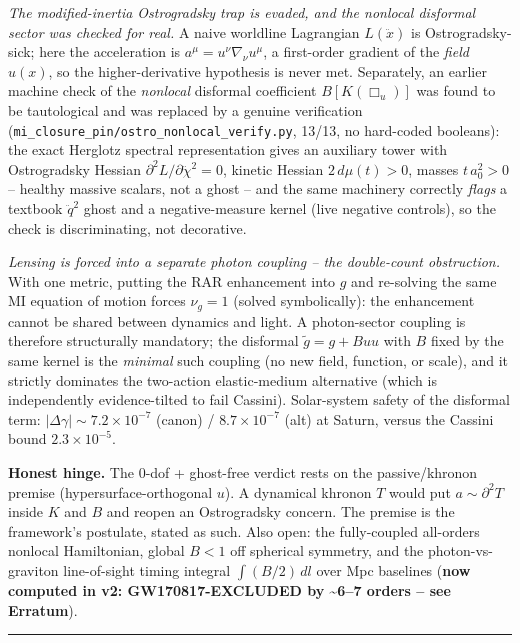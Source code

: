 \documentclass[
]{article}
\begin{document}
\emph{The modified-inertia Ostrogradsky trap is evaded, and the nonlocal
disformal sector was checked for real.} A naive worldline Lagrangian
\(L(\ddot x)\) is Ostrogradsky-sick; here the acceleration is
\(a^\mu = u^\nu \nabla_\nu u^\mu\), a first-order gradient of the
\emph{field} \(u(x)\), so the higher-derivative hypothesis is never met.
Separately, an earlier machine check of the \emph{nonlocal} disformal
coefficient \(B[K(\Box_u)]\) was found to be tautological and was
replaced by a genuine verification
(\texttt{mi\_closure\_pin/ostro\_nonlocal\_verify.py}, 13/13, no
hard-coded booleans): the exact Herglotz spectral representation gives
an auxiliary tower with Ostrogradsky Hessian
\(\partial^2 L/\partial\ddot\chi^2 = 0\), kinetic Hessian
\(2\, d\mu(t) > 0\), masses \(t\, a_0^2 > 0\) -- healthy massive
scalars, not a ghost -- and the same machinery correctly \emph{flags} a
textbook \(\ddot q^2\) ghost and a negative-measure kernel (live
negative controls), so the check is discriminating, not decorative.

\emph{Lensing is forced into a separate photon coupling -- the
double-count obstruction.} With one metric, putting the RAR enhancement
into \(g\) and re-solving the same MI equation of motion forces
\(\nu_g = 1\) (solved symbolically): the enhancement cannot be shared
between dynamics and light. A photon-sector coupling is therefore
structurally mandatory; the disformal \(\tilde g = g + B u u\) with
\(B\) fixed by the same kernel is the \emph{minimal} such coupling (no
new field, function, or scale), and it strictly dominates the two-action
elastic-medium alternative (which is independently evidence-tilted to
fail Cassini). Solar-system safety of the disformal term:
\(|\Delta\gamma| \sim 7.2 \times 10^{-7}\) (canon) /
\(8.7 \times 10^{-7}\) (alt) at Saturn, versus the Cassini bound
\(2.3 \times 10^{-5}\).

\textbf{Honest hinge.} The 0-dof + ghost-free verdict rests on the
passive/khronon premise (hypersurface-orthogonal \(u\)). A dynamical
khronon \(T\) would put \(a \sim \partial^2 T\) inside \(K\) and \(B\)
and reopen an Ostrogradsky concern. The premise is the framework's
postulate, stated as such. Also open: the fully-coupled all-orders
nonlocal Hamiltonian, global \(B < 1\) off spherical symmetry, and the
photon-vs-graviton line-of-sight timing integral \(\int (B/2)\, dl\)
over Mpc baselines (\textbf{now computed in v2: GW170817-EXCLUDED by
\textasciitilde6--7 orders -- see Erratum}).

\begin{center}\rule{0.5\linewidth}{0.5pt}\end{center}
\end{document}
